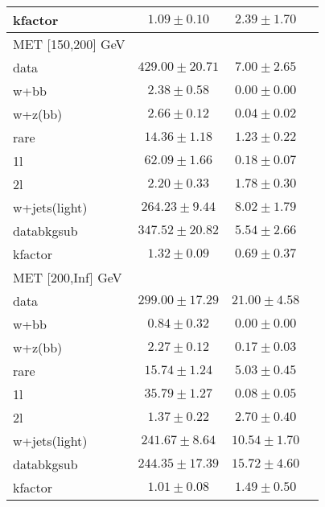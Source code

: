 \begin{table}
\begin{center}
\begin{tabular}{lccc}
kfactor&$1.09\pm0.10$&$2.39\pm1.70$\\
\hline\hline
\hline
MET [150,200] GeV   & &\\
\hline
data&$429.00\pm20.71$&$7.00\pm2.65$\\
\hline
w+bb&$2.38\pm0.58$&$0.00\pm0.00$\\
w+z(bb)&$2.66\pm0.12$&$0.04\pm0.02$\\
rare&$14.36\pm1.18$&$1.23\pm0.22$\\
1l&$62.09\pm1.66$&$0.18\pm0.07$\\
2l&$2.20\pm0.33$&$1.78\pm0.30$\\
w+jets(light)&$264.23\pm9.44$&$8.02\pm1.79$\\
\hline
databkgsub&$347.52\pm20.82$&$5.54\pm2.66$\\
kfactor&$1.32\pm0.09$&$0.69\pm0.37$\\
\hline\hline
\hline
MET [200,Inf] GeV & &\\
\hline
data&$299.00\pm17.29$&$21.00\pm4.58$\\
\hline
w+bb&$0.84\pm0.32$&$0.00\pm0.00$\\
w+z(bb)&$2.27\pm0.12$&$0.17\pm0.03$\\
rare&$15.74\pm1.24$&$5.03\pm0.45$\\
1l&$35.79\pm1.27$&$0.08\pm0.05$\\
2l&$1.37\pm0.22$&$2.70\pm0.40$\\
w+jets(light)&$241.67\pm8.64$&$10.54\pm1.70$\\
\hline
databkgsub&$244.35\pm17.39$&$15.72\pm4.60$\\
kfactor&$1.01\pm0.08$&$1.49\pm0.50$\\
\hline\hline
\hline
\end{tabular}
\end{center}
\end{table}
